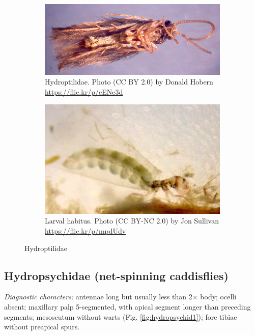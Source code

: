 \documentclass[letterpaper, 11pt]{article}
\begin{document}
\begin{figure}[ht!]
    \centering
    \begin{subfigure}[ht!]{0.5\textwidth}
        \includegraphics[width=\textwidth]{HydroptilidHabitus}
        \caption{Hydroptilidae. Photo (CC BY 2.0) by Donald Hobern \url{https://flic.kr/p/eENe3d}}
        \label{fig:hydrop1}
    \end{subfigure}
    \hfill %
    \begin{subfigure}[ht!]{0.45\textwidth}
        \includegraphics[width=\textwidth]{HydroptilidLarva}
        \caption{Larval habitus. Photo (CC BY-NC 2.0) by Jon Sullivan \url{https://flic.kr/p/mpdUdv}}
        \label{fig:hydroptilid2}
    \end{subfigure}
    \caption{Hydroptilidae}\label{fig:hydroptilids}
\end{figure}

\subsection{Hydropsychidae (net-spinning caddisflies)}
\noindent{}\textit{Diagnostic characters:} antennae long but usually less than 2$\times$ body; ocelli absent; maxillary palp 5-segmented, with apical segment longer than preceding segments; mesoscutum without warts (Fig. \ref{fig:hydropsychid1}); fore tibiae without preapical spurs.\\
\end{document}
